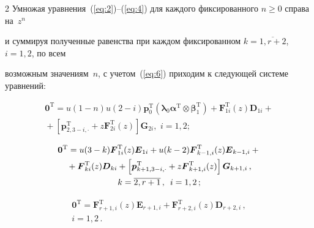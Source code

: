 \begin{multicols}{2}
Умножая уравнения~(\ref{eq:2})--(\ref{eq:4}) для каждого фиксированного $n\geq 0$ справа на~$z^n$ 

и суммируя полученные равенства при каждом фиксированном $k=\overline{1,r+2}$, $i=1,2$,  по всем 

возможным значениям~$n$, с учетом~(\ref{eq:6}) приходим к следующей системе уравнений:

\begin{multline}

\label{eq:7}

\boldsymbol{0}^{\mathrm{T}}=u(1-n)u(2-i)\boldsymbol{p}_0^{\mathrm{T}} \left(\boldsymbol{\lambda}_0\boldsymbol{\alpha}^{\mathrm{T}} \otimes\boldsymbol{\beta}_1^{\mathrm{T}}\right)+

\boldsymbol{F}_{1i}^{\mathrm{T}}(z)\boldsymbol{D}_{1i}+{}\\

{}+\left[\boldsymbol{p}_{2,3-i,\cdot}^{\mathrm{T}}+z\boldsymbol{F}_{2i}^{\mathrm{T}}(z)\right] \boldsymbol{G}_{2i},\,\, i=1,2;

\end{multline}

\begin{multline}

\label{eq:8}

\boldsymbol{0}^{\mathrm{T}}=u(3-k)\boldsymbol{F}_{1i}^{\mathrm{T}}(z)\boldsymbol{E}_{1i}+

u(k-2)\boldsymbol{F}_{k-1,i}^{\mathrm{T}}(z)\boldsymbol{E}_{k-1,i}+{}\\

{}+\boldsymbol{F}_{ki}^{\mathrm{T}}(z)\boldsymbol{D}_{ki}

+\left[\boldsymbol{p}_{k+1,3-i,\cdot}^{\mathrm{T}}+z\boldsymbol{F}_{k+1,i}^{\mathrm{T}}(z) \right] \boldsymbol{G}_{k+1,i}\,,\\

k=\overline{2,r+1}\,,\enskip i=1,2\,;

\end{multline}

\begin{multline}

\label{eq:9}

\boldsymbol{0}^{\mathrm{T}}=\boldsymbol{F}_{r+1,i}^{\mathrm{T}}(z)\boldsymbol{E}_{r+1,i}+

\boldsymbol{F}_{r+2,i}^{\mathrm{T}}(z)\boldsymbol{D}_{r+2,i}\,,\\ i=1,2\,.

\end{multline}




\end{multicols}
